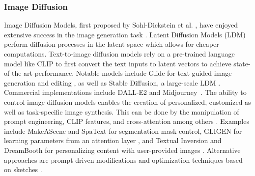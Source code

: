 \subsubsection{Image Diffusion}
Image Diffusion Models, first proposed by Sohl-Dickstein et al. \cite{sohldickstein2015deepunsupervisedlearningusing}, 
have enjoyed extensive success in the image generation task \cite{dhariwal2021diffusionmodelsbeatgans, kingma2023variationaldiffusionmodels}. 
Latent Diffusion Models (LDM) \cite{rombach2022stablediffusion} perform diffusion processes 
in the latent space which allows for cheaper computations. Text-to-image diffusion models rely 
on a pre-trained language model like CLIP \cite{radford2021learningtransferablevisualmodels} 
to first convert the text inputs to latent vectors to achieve state-of-the-art performance. 
Notable models include Glide for text-guided image generation and editing \cite{nichol2022glidephotorealisticimagegeneration}, 
as well as Stable Diffusion, a large-scale LDM \cite{rombach2022stablediffusion}. Commercial 
implementations include DALL-E2 \cite{2023dalle2} and Midjourney~\cite{2023midjourney}. 
The ability to control image diffusion models enables the creation of personalized, customized
as well as task-specific image synthesis. This can be done by the manipulation of prompt 
engineering, CLIP features, and cross-attention among others 
\cite{parmar2023zeroshotimagetoimagetranslation, gafni2022makeascenescenebasedtexttoimagegeneration}. 
Examples include MakeAScene \cite{gafni2022makeascenescenebasedtexttoimagegeneration} and 
SpaText \cite{Avrahami_2023} for segmentation mask control, GLIGEN for 
learning parameters from an attention layer \cite{li2023gligenopensetgroundedtexttoimage}, 
and Textual Inversion and DreamBooth for personalizing content with user-provided images 
\cite{gal2022imageworthwordpersonalizing, ruiz2023dreamboothfinetuningtexttoimage}. 
Alternative approaches are prompt-driven modifications \cite{brooks2023instructpix2pixlearningfollowimage, huang2023regionawarediffusionzeroshottextdriven, tumanyan2022plugandplaydiffusionfeaturestextdriven} 
and optimization techniques based on sketches \cite{voynov2022sketchguidedtexttoimagediffusionmodels}.

